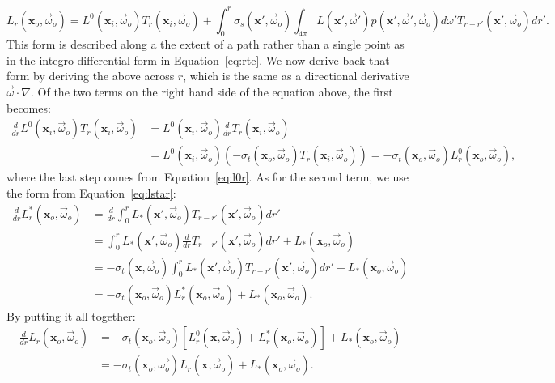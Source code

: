 \begin{equation}
\label{eq:integralformrte}
L_r(\mathbf{x}_o, \vec{\omega}_o) =  L^0(\mathbf{x}_i, \vec{\omega}_o) T_r(\mathbf{x}_i, \vec{\omega}_o) + \int_0^r \sigma_s(\mathbf{x}', \vec{\omega}_o) \int_{4\pi} L(\mathbf{x}', \vec{\omega}') p(\mathbf{x}', \vec{\omega}', \vec{\omega}_o)  d\omega' T_{r-r'}(\mathbf{x}', \vec{\omega}_o)  dr'.
\end{equation}
This form is described along a the extent of a path rather than a single point as in the integro differential form in Equation~\ref{eq:rte}. We now derive back that form by deriving the above across $r$, which is the same as a directional derivative $ \vec{\omega} \cdot \nabla$. Of the two terms on the right hand side of the equation above, the first becomes:
\begin{equation*}
\begin{split}
\frac{d}{dr} L^0(\mathbf{x}_i, \vec{\omega}_o) T_r(\mathbf{x}_i, \vec{\omega}_o) &= L^0(\mathbf{x}_i, \vec{\omega}_o) \frac{d}{dr}  T_r(\mathbf{x}_i, \vec{\omega}_o) \\
&= L^0(\mathbf{x}_i, \vec{\omega}_o) (-\sigma_t(\mathbf{x}_o, \vec{\omega}_o) T_r(\mathbf{x}_i, \vec{\omega}_o)) = -\sigma_t(\mathbf{x}_o, \vec{\omega}_o) L_r^0(\mathbf{x}_o, \vec{\omega}_o),
\end{split}
\end{equation*}
where the last step comes from Equation~\ref{eq:l0r}. As for the second term, we use the form from Equation~\ref{eq:lstar}:
\begin{equation*}
\begin{split}
\frac{d}{dr} L^*_r(\mathbf{x}_o, \vec{\omega}_o) &= \frac{d}{dr} \int_0^r L_*(\mathbf{x}', \vec{\omega}_o) T_{r-r'}(\mathbf{x}', \vec{\omega}_o)  dr' \\
&= \int_0^r L_*(\mathbf{x}', \vec{\omega}_o) \frac{d}{dr} T_{r-r'}(\mathbf{x}', \vec{\omega}_o)  dr' + L_*(\mathbf{x}_o, \vec{\omega}_o)
 \\
 &= -\sigma_t(\mathbf{x}, \vec{\omega}_o)  \int_0^r L_*(\mathbf{x}', \vec{\omega}_o) T_{r-r'}(\mathbf{x}', \vec{\omega}_o)  dr' + L_*(\mathbf{x}_o, \vec{\omega}_o) \\
 &= -\sigma_t(\mathbf{x}_o, \vec{\omega}_o) L^*_r(\mathbf{x}_o, \vec{\omega}_o) + L_*(\mathbf{x}_o, \vec{\omega}_o).
\end{split}
\end{equation*}
By putting it all together:
\begin{equation*}
\begin{split}
\frac{d}{dr} L_r(\mathbf{x}_o, \vec{\omega}_o) &= -\sigma_t(\mathbf{x}_o, \vec{\omega}_o) [L^0_r(\mathbf{x}, \vec{\omega}_o) + L^*_r(\mathbf{x}_o, \vec{\omega}_o)] + L_*(\mathbf{x}_o, \vec{\omega}_o) \\
&=  -\sigma_t(\mathbf{x}_o, \vec{\omega_o}) L_r(\mathbf{x}, \vec{\omega}_o) +  L_*(\mathbf{x}_o, \vec{\omega}_o) .
\end{split}
\end{equation*}
